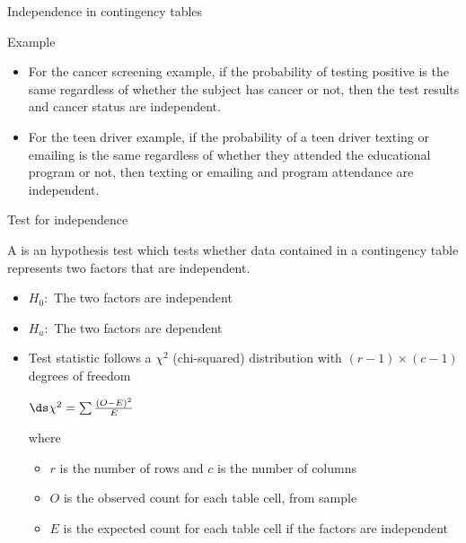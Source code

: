 \documentclass[xcolor=table]{beamer}
\begin{document}
\begin{frame}{Independence in contingency tables}
\begin{exampleblock}{Example}
\large
\begin{itemize}
\item For the cancer screening example, if the probability of testing positive is the same regardless of whether the subject has cancer or not, then the test results and cancer status are independent.

\pause\item For the teen driver example, if the probability of a teen driver texting or emailing is the same regardless of whether they attended the educational program or not, then texting or emailing and program attendance are independent.
\end{itemize}
\end{exampleblock}
\end{frame}

\begin{frame}{Test for independence}
\begin{block}{}
\large
A  is an hypothesis test which tests whether data contained in a contingency table represents two factors that are independent.
\begin{itemize}
\pause\item $H_0:$ The two factors are independent
\pause\item $H_a:$ The two factors are dependent\\
\pause\item Test statistic follows a $\chi^2$ (chi-squared) distribution with $(r-1) \times (c-1)$ degrees of freedom\\
\medskip
{\centering
$\ds \chi^2 = \sum \frac {(O-E)^2}{E}$
\par}
\medskip
where
\begin{itemize}
\item $r$ is the number of rows and $c$ is the number of columns
\item $O$ is the observed count for each table cell, from sample
\item $E$ is the expected count for each table cell if the factors are independent
\end{itemize}
\end{itemize}
\end{block}
\end{frame}
\end{document}
